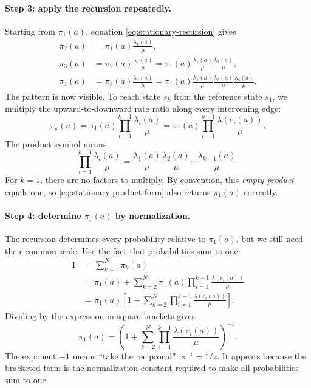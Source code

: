 \documentclass[11pt]{article}
\theoremstyle{tutorial}
\theoremstyle{remark}
\newcommand{\1}{\mathbb{I}}
\begin{document}
\paragraph{Step 3: apply the recursion repeatedly.}
Starting from $\pi_1(a)$, equation \eqref{eq:stationary-recursion} gives
\begin{align*}
\pi_2(a)
&=\pi_1(a)\frac{\lambda_1(a)}{\mu},\\
\pi_3(a)
&=\pi_2(a)\frac{\lambda_2(a)}{\mu}
=\pi_1(a)\frac{\lambda_1(a)}{\mu}\frac{\lambda_2(a)}{\mu},\\
\pi_4(a)
&=\pi_3(a)\frac{\lambda_3(a)}{\mu}
=\pi_1(a)\frac{\lambda_1(a)}{\mu}
             \frac{\lambda_2(a)}{\mu}
             \frac{\lambda_3(a)}{\mu}.
\end{align*}
The pattern is now visible.  To reach state $s_k$ from the reference state $s_1$, we multiply the
upward-to-downward rate ratio along every intervening edge:
\begin{equation}
  \boxed{
  \pi_k(a)=\pi_1(a)\prod_{i=1}^{k-1}\frac{\lambda_i(a)}{\mu}
  =\pi_1(a)\prod_{i=1}^{k-1}\frac{\lambda(e_i(a))}{\mu}.}
  \label{eq:stationary-product-form}
\end{equation}
The product symbol means
\[
  \prod_{i=1}^{k-1}\frac{\lambda_i(a)}{\mu}
  =\frac{\lambda_1(a)}{\mu}\frac{\lambda_2(a)}{\mu}\cdots
   \frac{\lambda_{k-1}(a)}{\mu}.
\]
For $k=1$, there are no factors to multiply.  By convention, this \emph{empty product} equals one, so
\eqref{eq:stationary-product-form} also returns $\pi_1(a)$ correctly.

\paragraph{Step 4: determine $\pi_1(a)$ by normalization.}
The recursion determines every probability relative to $\pi_1(a)$, but we still need their common scale.
Use the fact that probabilities sum to one:
\begin{align*}
1
&=\sum_{k=1}^N\pi_k(a)\\
&=\pi_1(a)+\sum_{k=2}^N
\pi_1(a)\prod_{i=1}^{k-1}\frac{\lambda(e_i(a))}{\mu}\\
&=\pi_1(a)\left[
1+\sum_{k=2}^N\prod_{i=1}^{k-1}\frac{\lambda(e_i(a))}{\mu}
\right].
\end{align*}
Dividing by the expression in square brackets gives
\begin{equation}
  \boxed{
  \pi_1(a)=\left(
  1+\sum_{k=2}^N\prod_{i=1}^{k-1}\frac{\lambda(e_i(a))}{\mu}
  \right)^{-1}.}
  \label{eq:stationary-normalizer}
\end{equation}
The exponent $-1$ means ``take the reciprocal'': $z^{-1}=1/z$.  It appears because the bracketed term is
the normalization constant required to make all probabilities sum to one.
\end{document}

